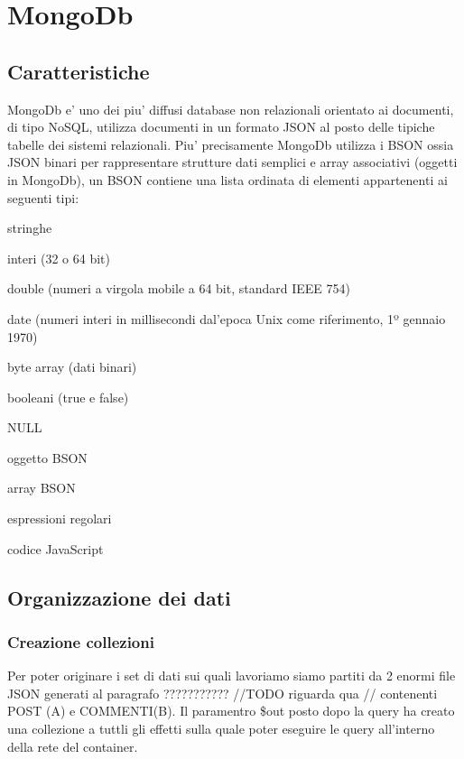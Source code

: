 \chapter{MongoDb}

\section{Caratteristiche}

MongoDb e' uno dei piu' diffusi database non relazionali orientato ai documenti, di tipo NoSQL,  utilizza documenti in un formato JSON al posto delle tipiche tabelle 
dei sistemi relazionali. Piu' precisamente MongoDb utilizza i BSON ossia JSON binari per rappresentare strutture dati semplici e array associativi (oggetti in MongoDb),
un BSON contiene una lista ordinata di elementi appartenenti ai seguenti tipi:

\begin{list}{}{}
    \item stringhe
    \item interi (32 o 64 bit)
    \item double (numeri a virgola mobile a 64 bit, standard IEEE 754)
    \item date (numeri interi in millisecondi dal'epoca Unix come riferimento, 1º gennaio 1970)
    \item byte array (dati binari)
    \item booleani (true e false)
    \item NULL
    \item oggetto BSON
    \item array BSON
    \item espressioni regolari
    \item codice JavaScript
\end{list}

\section{Organizzazione dei dati}

\subsection{Creazione collezioni}

Per poter originare i set di dati sui quali lavoriamo siamo partiti da 2 enormi file JSON generati al paragrafo ??????????? //TODO riguarda qua //
contenenti POST (A) e COMMENTI(B). Il paramentro \$out posto dopo la query ha creato una collezione a tuttli gli effetti sulla quale poter eseguire le query
all'interno della rete del container.

